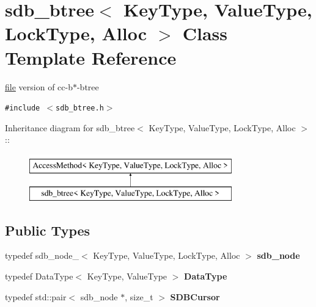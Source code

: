 \hypertarget{classsdb__btree}{
\section{sdb\_\-btree$<$ KeyType, ValueType, LockType, Alloc $>$ Class Template Reference}
\label{classsdb__btree}
}
\hyperlink{classfile}{file} version of cc-b$\ast$-btree  


{\tt \#include $<$sdb\_\-btree.h$>$}

Inheritance diagram for sdb\_\-btree$<$ KeyType, ValueType, LockType, Alloc $>$::\begin{figure}[H]
\begin{center}
\leavevmode
\includegraphics[height=2cm]{classsdb__btree}
\end{center}
\end{figure}
\subsection*{Public Types}
\begin{CompactItemize}
\item 
\hypertarget{classsdb__btree_15a24f87a9a407de8b68ee054af3b54a}{
typedef sdb\_\-node\_\-$<$ KeyType, ValueType, LockType, Alloc $>$ \textbf{sdb\_\-node}}
\label{classsdb__btree_15a24f87a9a407de8b68ee054af3b54a}

\item 
\hypertarget{classsdb__btree_d6105a305901616127f769f0147a5e03}{
typedef DataType$<$ KeyType, ValueType $>$ \textbf{DataType}}
\label{classsdb__btree_d6105a305901616127f769f0147a5e03}

\item 
\hypertarget{classsdb__btree_6c8e77fb4c105a87903d11cb6b28f62c}{
typedef std::pair$<$ sdb\_\-node $\ast$, size\_\-t $>$ \textbf{SDBCursor}}
\label{classsdb__btree_6c8e77fb4c105a87903d11cb6b28f62c}

\end{CompactItemize}
